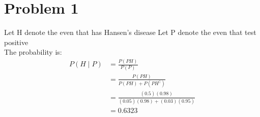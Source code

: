 \documentclass[12pt,letterpaper]{article}
\begin{document}
    \section*{Problem 1}
        Let H denote the even that has Hansen’s disease
        Let P denote the even that test positive\\
        The probability is:\\
        \begin{align*}
            P(H \mid P) &= \frac{P(PH)}{P(P)}\\
                        &= \frac{P(PH)}{P(PH) + P(PH^\complement)}\\
                        &= \frac{(0.5)(0.98)}{(0.05)(0.98) + (0.03)(0.95)}\\
                        &= 0.6323
        \end{align*}
    
\end{document}
